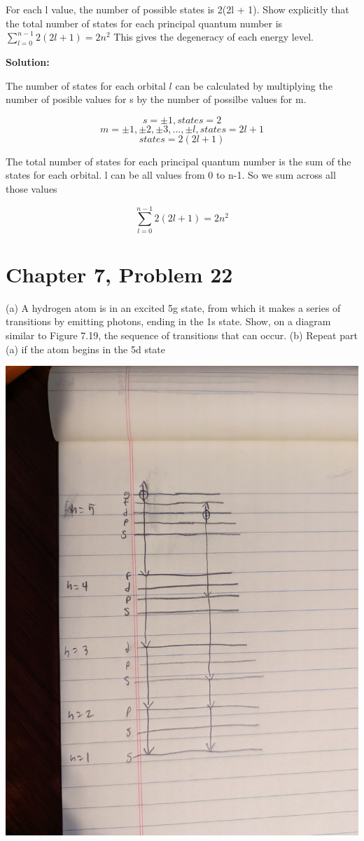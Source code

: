 \documentclass[12pt]{article}
\begin{document}
For each l value, the number of possible states is 2(2l + 1).  Show explicitly that the total number of states for each principal quantum number is $\sum_{l=0}^{n-1} 2(2l + 1) = 2n^2$ This gives the degeneracy of each energy level.

\textbf{Solution:}

The number of states for each orbital $l$ can be calculated by multiplying the number of posible values for s by the number of possilbe values for m.

$$ s = \pm1, states = 2 $$
$$ m = \pm1, \pm2, \pm3, ..., \pm l, states = 2l + 1 $$
$$ states = 2(2l + 1) $$

The total number of states for each principal quantum number is the sum of the states for each orbital. l can be all values from 0 to n-1. So we sum across all those values

$$ \sum_{l=0}^{n-1} 2(2l + 1) = 2n^2$$


\section{Chapter 7, Problem 22}

(a) A hydrogen atom is in an excited 5g state, from which it makes a series of transitions by emitting photons, ending in the 1s state. Show, on a diagram similar to Figure 7.19, the sequence of transitions that can occur. (b) Repeat part (a) if the atom begins in the 5d state

\includegraphics[width=\textwidth]{hw6-state-diagram.jpg}
\end{document}
